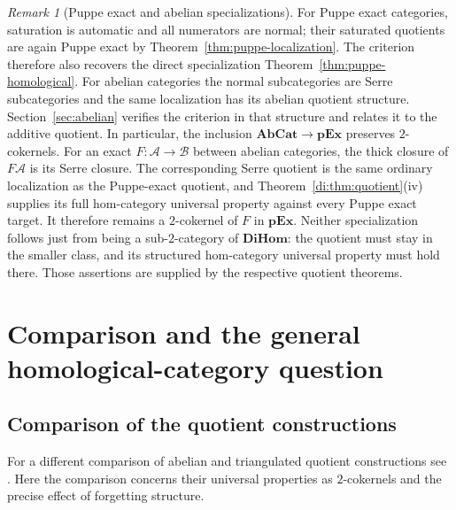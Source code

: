 \documentclass[11pt,reqno,a4paper]{amsart}
\theoremstyle{definition}
\theoremstyle{remark}
\newtheorem{remark}[theorem]{Remark}
\newcommand{\A}{\mathcal{A}}
\newcommand{\0}{\mathbf{0}}
\renewcommand{\1}{\mathbf{1}}
\newcommand{\AbCat}{\mathbf{AbCat}}
\newcommand{\pExact}{\mathbf{pEx}}
\newcommand{\DiHom}{\mathbf{DiHom}}
\newcommand{\B}{\mathcal B}
\begin{document}
\begin{remark}[Puppe exact and abelian specializations]
For Puppe exact categories, saturation is automatic and all
numerators are normal; their saturated quotients are again Puppe
exact by Theorem~\ref{thm:puppe-localization}. The criterion
therefore also recovers the direct specialization
Theorem~\ref{thm:puppe-homological}. For abelian categories the
normal subcategories are Serre subcategories and the same
localization has its abelian quotient structure. Section~\ref{sec:abelian}
verifies the criterion in that structure and relates it to the
additive quotient. In particular, the inclusion $\AbCat\to\pExact$
preserves $2$-cokernels. For an exact $F:\A\to\B$ between
abelian categories, the thick closure of $F\A$ is its Serre
closure. The corresponding Serre quotient is the same ordinary
localization as the Puppe-exact quotient, and
Theorem~\ref{di:thm:quotient}(iv) supplies its full hom-category
universal property against every Puppe exact target. It therefore
remains a $2$-cokernel of $F$ in $\pExact$.
Neither specialization follows just from being a sub-$2$-category
of $\DiHom$: the quotient must stay in the smaller class, and its
structured hom-category universal property must hold there. Those
assertions are supplied by the respective quotient theorems.
\end{remark}


\section{Comparison and the general homological-category question}\label{sec:comparison}

\subsection{Comparison of the quotient constructions}\label{subsec:quotient-comparison}

For a different comparison of abelian and triangulated quotient
constructions see \cite{Krause}. Here the comparison concerns their
universal properties as $2$-cokernels and the precise effect of forgetting
structure.
\end{document}
